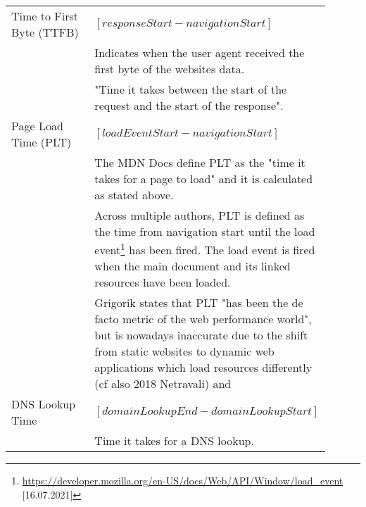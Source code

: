 \begin{center}
	\small
	\begin{longtable}{ | p{0.3\linewidth} | p{0.6\linewidth} | }
	\hline
	Time to First Byte (TTFB)
	& $[responseStart - navigationStart]$ \\
	& Indicates when the user agent received the first byte of the websites data. \\
	& "Time it takes between the start of the request and the start of the response".  \\%
	
	\hline
	Page Load Time (PLT)
	& $[loadEventStart - navigationStart]$ \\
	& The MDN Docs define PLT as the "time it takes for a page to load" and it is calculated as stated above.  \\ %
	& Across multiple authors, PLT is defined as the time from navigation start until the load event\footnote{\url{https://developer.mozilla.org/en-US/docs/Web/API/Window/load_event} [16.07.2021]} has been fired.
	The load event is fired when the main document and its linked resources have been loaded. \\
	& Grigorik states that PLT "has been the de facto metric of the web performance world", but is nowadays inaccurate due to the shift from static websites to dynamic web applications which load resources differently (cf also 2018 Netravali) and \\ %
			
	
	\hline
	DNS Lookup Time
	& $[domainLookupEnd - domainLookupStart]$ \\
	& Time it takes for a DNS lookup.  \\
	

\end{longtable}
\end{center}
